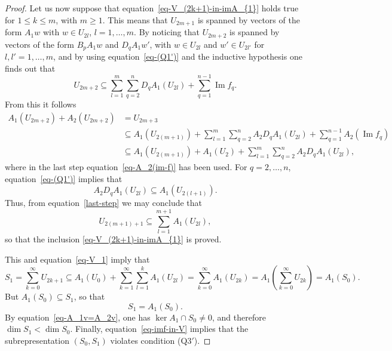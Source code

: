 \begin{proof}
Let us now suppose that equation~\eqref{eq-V_(2k+1)-in-imA_{1}} holds true for $1\leq k \leq m$, with $m\geq 1$. This means that $U_{2m+1}$ is spanned by vectors of the form
$A_{1}w$ with $w\in U_{2l}$, $l=1,\dots,m$.
By noticing that $U_{2m+2}$ is spanned by vectors of the form $B_{p}A_{1}w$ and $D_{q}A_{1}w'$, with $w\in U_{2l}$ and $w'\in U_{2l'}$ for $l,l'=1,\dots,m$, and by using equation~\eqref{eq-(Q1')} and the inductive hypothesis one
finds out that
\begin{equation*}
U_{2m+2}\subseteq \sum_{l=1}^{m} \sum_{q=2}^{n}D_{q}A_{1}(U_{2l})+\sum_{q=1}^{n-1}\operatorname{Im} f_{q} .
\end{equation*}
From this it follows
\begin{align}
A_1(U_{2m+2}) + A_2(U_{2m+2}) &= U_{2m+3} \nonumber\\
& \subseteq A_{1}(U_{2(m+1)})+\sum_{l=1}^{m} \sum_{q=2}^{n}A_{2}D_{q}A_{1}(U_{2l}) +\sum_{q=1}^{n-1}A_{2}(\operatorname{Im} f_{q}) \nonumber\\
& \subseteq A_{1}(U_{2(m+1)})+A_{1}(U_{2})+\sum_{l=1}^{m} \sum_{q=2}^{n}A_{2}D_{q}A_{1}(U_{2l}) ,\label{last-step}
\end{align}
where in the last step equation~\eqref{eq-A_2(im-f)} has been used.
For $q=2,\dots, n$, equation~\eqref{eq-(Q1')} implies that
\begin{equation*}
A_{2}D_{q}A_{1}(U_{2l}) \subseteq A_{1}(U_{2(l+1)}) .
\end{equation*}
Thus, from equation~\eqref{last-step} we may conclude that
\begin{equation*}
U_{2(m+1)+1}\subseteq\sum_{l=1}^{m+1}A_{1}(U_{2l}) ,
\end{equation*}
so that the inclusion \eqref{eq-V_(2k+1)-in-imA_{1}} is proved.

This and equation~\eqref{eq-V_1} imply that
\begin{equation*}
S_{1}=\sum_{k=0}^{\infty}U_{2k+1}\subseteq A_{1}(U_{0})+\sum_{k=1}^{\infty}\sum_{l=1}^{k}A_{1}(U_{2l})=\sum_{k=0}^{\infty}A_{1}(U_{2k})= A_{1}\left(\sum_{k=0}^{\infty}U_{2k}\right)=A_{1}(S_{0}).
\end{equation*}
But $A_{1}(S_{0})\subseteq S_{1}$, so that
\begin{equation*}
S_{1}=A_{1}(S_{0}) .
\end{equation*}
By equation~\eqref{eq-A_1v=A_2v}, one has $\ker A_{1}\cap S_{0}\neq0$, and therefore $\dim S_{1}<\dim S_{0}$.
Finally, equation~\eqref{eq-imf-in-V} implies that the subrepresentation $(S_{0},S_{1})$ violates condition (Q$3'$).
 \end{proof}

